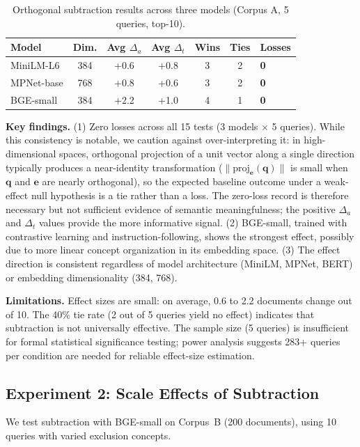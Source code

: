 \documentclass{article}
\begin{document}
\begin{table}[ht]
\centering
\caption{Orthogonal subtraction results across three models (Corpus A, 5 queries, top-10).}
\label{tab:exp1}
\begin{tabular}{lcccccl}
\toprule
Model & Dim. & Avg $\Delta_a$ & Avg $\Delta_t$ & Wins & Ties & Losses \\
\midrule
MiniLM-L6 & 384 & +0.6 & +0.8 & 3 & 2 & \textbf{0} \\
MPNet-base & 768 & +0.8 & +0.6 & 3 & 2 & \textbf{0} \\
BGE-small & 384 & +2.2 & +1.0 & 4 & 1 & \textbf{0} \\
\bottomrule
\end{tabular}
\end{table}

\textbf{Key findings.} (1) Zero losses across all 15 tests (3 models $\times$ 5 queries). While this consistency is notable, we caution against over-interpreting it: in high-dimensional spaces, orthogonal projection of a unit vector along a single direction typically produces a near-identity transformation ($\|\text{proj}_\mathbf{e}(\mathbf{q})\|$ is small when $\mathbf{q}$ and $\mathbf{e}$ are nearly orthogonal), so the expected baseline outcome under a weak-effect null hypothesis is a tie rather than a loss. The zero-loss record is therefore necessary but not sufficient evidence of semantic meaningfulness; the positive $\Delta_a$ and $\Delta_t$ values provide the more informative signal. (2) BGE-small, trained with contrastive learning and instruction-following, shows the strongest effect, possibly due to more linear concept organization in its embedding space. (3) The effect direction is consistent regardless of model architecture (MiniLM, MPNet, BERT) or embedding dimensionality (384, 768).

\textbf{Limitations.} Effect sizes are small: on average, 0.6 to 2.2 documents change out of 10. The 40\% tie rate (2 out of 5 queries yield no effect) indicates that subtraction is not universally effective. The sample size (5 queries) is insufficient for formal statistical significance testing; power analysis suggests 283+ queries per condition are needed for reliable effect-size estimation.

\subsection{Experiment 2: Scale Effects of Subtraction}

We test subtraction with BGE-small on Corpus~B (200 documents), using 10 queries with varied exclusion concepts.
\end{document}
